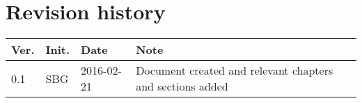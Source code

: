\label{chp_revisionHistory}
\chapter{Revision history}

\begin{tabular}{b{1cm} b{1cm} b{2cm} b{8cm}}
	\textbf{Ver.} & \textbf{Init.} & \textbf{Date} & \textbf{Note}\\
	\hline
    0.1 & SBG & 2016-02-21 & Document created and relevant chapters and sections added \\
\end{tabular}

